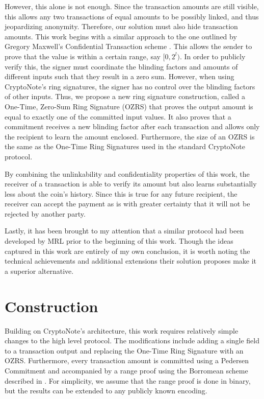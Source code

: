 \documentclass{article}
\begin{document}
However, this alone is not enough.  Since the transaction amounts are still
visible, this allows any two transactions of equal amounts to be possibly
linked, and thus jeopardizing anonymity.  Therefore, our solution must also
hide transaction amounts.  This work begins with a similar approach to the one
outlined by Gregory Maxwell's Confidential Transaction scheme \cite{M15}.  This
allows the sender to prove that the value is within a certain range, say
$[0,2^l)$.  In order to publicly verify this, the signer must coordinate the
blinding factors and amounts of different inputs such that they result in a zero
sum.  However, when using CryptoNote's ring signatures, the signer has no
control over the blinding factors of other inputs.  Thus, we propose a new ring
signature construction, called a One-Time, Zero-Sum Ring Signature (OZRS) that
proves the output amount is equal to exactly one of the committed input values.
It also proves that a commitment receives a new blinding factor after each
transaction and allows only the recipient to learn the amount enclosed.
Furthermore, the size of an OZRS is the same as the One-Time Ring Signatures
used in the standard CryptoNote protocol.

By combining the unlinkability and confidentiality properties of this work, the
receiver of a transaction is able to verify its amount but also learns
substantially less about the coin's history.  Since this is true for any future
recipient, the receiver can accept the payment as is with greater certainty that
it will not be rejected by another party.

Lastly, it has been brought to my attention that a similar protocol had been
developed by MRL \cite{N15} prior to the beginning of this work.  Though the
ideas captured in this work are entirely of my own conclusion, it is worth
noting the technical achievements and additional extensions their solution
proposes make it a superior alternative.

\section{Construction}

Building on CryptoNote's architecture, this work requires relatively simple
changes to the high level protocol.  The modifications include adding a single
field to a transaction output and replacing the One-Time Ring Signature with an
OZRS.  Furthermore, every transaction amount is committed using a Pedersen
Commitment and accompanied by a range proof using the Borromean scheme described
in \cite{MP15}.  For simplicity, we assume that the range proof is done in
binary, but the results can be extended to any publicly known encoding.
\end{document}
